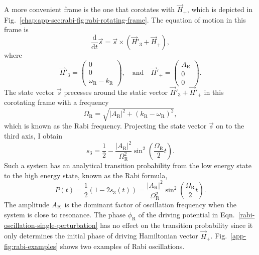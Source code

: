 


A more convenient frame is the one that corotates with $\vec{H}_+$, which is depicted in Fig.~\ref{chap:app-sec:rabi-fig:rabi-rotating-frame}. The equation of motion in this frame is
\begin{equation}
\frac{\mathrm d}{\mathrm d t } \vec{s} = \vec{s} \times (\vec{H}'_3 + \vec{H}_+),
\end{equation}
where
\begin{equation}
\vec{H}'_3 = \begin{pmatrix}
    0 \\ 0 \\ 　\omega_{\mathrm{R}} - k_{\mathrm R}
  \end{pmatrix}, \quad \text{and} \quad \vec{H}'_+ = \begin{pmatrix}
    A_{\mathrm{R}} \\ 0 \\ 　0
    \end{pmatrix}.
\end{equation}
The state vector $\vec{s}$ precesses around the static vector $\vec{H}'_3 + \vec{H}'_+$ in this corotating frame with a frequency
\begin{equation}
    \Omega_{\mathrm R} = \sqrt{ \lvert A_{\mathrm{R}}\rvert^2 + (k_{\mathrm{R}} - \omega_{\mathrm R})^2 },
    \label{app:rabi-frequency}
\end{equation}
which is known as the Rabi frequency.
Projecting the state vector $\vec{s}$ on to the third axis, I obtain
\begin{equation}
s_3 = \frac{1}{2} - \frac{\lvert A_{\mathrm R}\rvert ^2}{\Omega_{\mathrm R}^2}\sin^2\left(\frac{\Omega_{\mathrm R}}{2} t\right).
\end{equation}
Such a system has an analytical transition probability from the low energy state to the high energy state, known as the Rabi formula,
\begin{equation}
    P(t) = \frac{1}{2}(1- 2 s_3(t))= \frac{\left \lvert A_{\mathrm{R}} \right \rvert ^2}{ \Omega_{\mathrm R}^2 } \sin^2 \left( \frac{\Omega_{\mathrm R}}{2} t \right).
    \label{app:rabi-system-transition-probability}
\end{equation}
The amplitude $A_\mathrm R$ is the dominant factor of oscillation frequency when the system is close to resonance. The phase $\phi_{\mathrm{R}}$ of the driving potential in Eqn.~\ref{rabi-oscillation-single-perturbation} has no effect on the transition probability since it only determines the initial phase of driving Hamiltonian vector $\vec{H}_+$. Fig.~\ref{app-fig:rabi-examples} shows two examples of Rabi oscillations.

